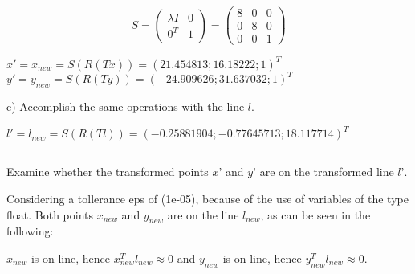 \documentclass[a4paper,headings=small]{scrartcl}
\numberwithin{equation}{section} %
\numberwithin{figure}{section}   %
\begin{document}
\[S =
\left( \begin{array}{cc}
\lambda I & 0  \\
0^T & 1   \end{array} \right)
=
\left( \begin{array}{ccc}
8 & 0 & 0 \\
0 & 8 & 0 \\
0 & 0 & 1 \end{array} \right)\]

$x'=x_{new} = S(R(Tx)) = (21.454813; 16.18222; 1)^T$ \\
$y'=y_{new} = S(R(Ty)) = (-24.909626; 31.637032; 1)^T$

c) Accomplish the same operations with the line $l$.

      $l' = l_{new} = S(R(Tl)) = (-0.25881904; -0.77645713; 18.117714)^T$




\subsection{}

Examine whether the transformed points $x’$ and $y’$ are
on the transformed line $l’$.

Considering a tollerance eps of (1e-05),
because of the use of variables of the type float.
Both points $x_{new}$ and $y_{new}$
are on the line $l_{new}$, as can be seen in the following:

$x_{new}$ is on line, hence $x_{new}^Tl_{new} \approx 0$ and $y_{new}$ is on line, hence $y_{new}^Tl_{new} \approx 0$.
\end{document}

